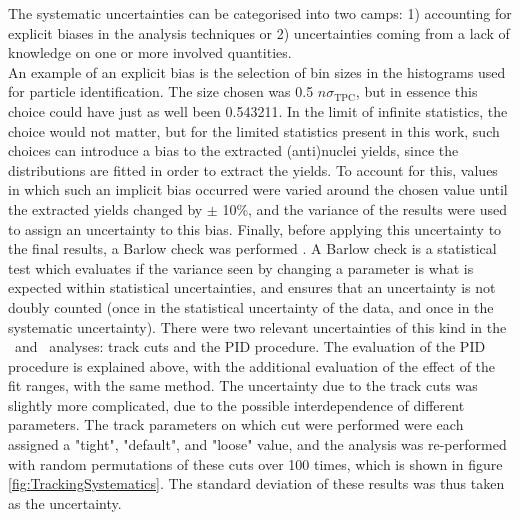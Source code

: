 The systematic uncertainties can be categorised into two camps: 1) accounting for explicit biases in the analysis techniques or 2) uncertainties coming from a lack of knowledge on one or more involved quantities. \\
An example of an explicit bias is the selection of bin sizes in the histograms used for particle identification. The size chosen was 0.5 $n\sigma_{\mathrm{TPC}}$, but in essence this choice could have just as well been 0.543211. In the limit of infinite statistics, the choice would not matter, but for the limited statistics present in this work, such choices can introduce a bias to the extracted (anti)nuclei yields, since the distributions are fitted in order to extract the yields. To account for this, values in which such an implicit bias occurred were varied around the chosen value until the extracted yields changed by $\pm$ 10\%, and the variance of the results were used to assign an uncertainty to this bias. Finally, before applying this uncertainty to the final results, a Barlow check was performed \cite{Barlow:2002yb}. A Barlow check is a statistical test which evaluates if the variance seen by changing a parameter is what is expected within statistical uncertainties, and ensures that an uncertainty is not doubly counted (once in the statistical uncertainty of the data, and once in the systematic uncertainty). There were two relevant uncertainties of this kind in the \ahe\ and \atrit\ analyses: track cuts and the PID procedure. The evaluation of the PID procedure is explained above, with the additional evaluation of the effect of the fit ranges, with the same method. The uncertainty due to the track cuts was slightly more complicated, due to the possible interdependence of different parameters. The track parameters on which cut were performed were each assigned a "tight", "default", and "loose" value, and the analysis was re-performed with random permutations of these cuts over 100 times, which is shown in figure \ref{fig:TrackingSystematics}. The standard deviation of these results was thus taken as the uncertainty. \\

